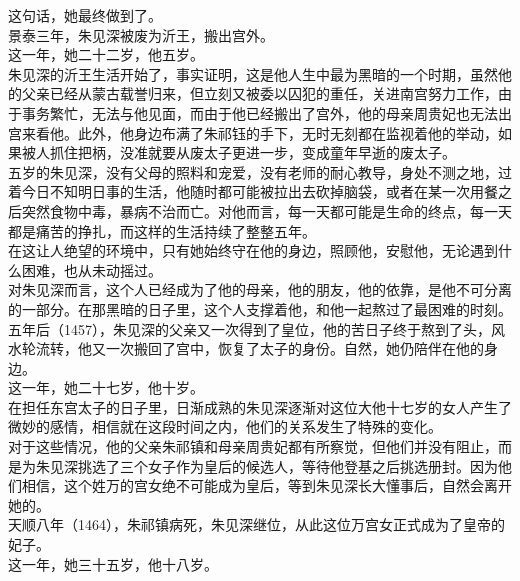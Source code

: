 \begin{multicols}{\theparacolNo}
这句话，她最终做到了。\\

景泰三年，朱见深被废为沂王，搬出宫外。\\

这一年，她二十二岁，他五岁。\\

朱见深的沂王生活开始了，事实证明，这是他人生中最为黑暗的一个时期，虽然他的父亲已经从蒙古载誉归来，但立刻又被委以囚犯的重任，关进南宫努力工作，由于事务繁忙，无法与他见面，而由于他已经搬出了宫外，他的母亲周贵妃也无法出宫来看他。此外，他身边布满了朱祁钰的手下，无时无刻都在监视着他的举动，如果被人抓住把柄，没准就要从废太子更进一步，变成童年早逝的废太子。\\

五岁的朱见深，没有父母的照料和宠爱，没有老师的耐心教导，身处不测之地，过着今日不知明日事的生活，他随时都可能被拉出去砍掉脑袋，或者在某一次用餐之后突然食物中毒，暴病不治而亡。对他而言，每一天都可能是生命的终点，每一天都是痛苦的挣扎，而这样的生活持续了整整五年。\\

在这让人绝望的环境中，只有她始终守在他的身边，照顾他，安慰他，无论遇到什么困难，也从未动摇过。\\

对朱见深而言，这个人已经成为了他的母亲，他的朋友，他的依靠，是他不可分离的一部分。在那黑暗的日子里，这个人支撑着他，和他一起熬过了最困难的时刻。\\

五年后（1457），朱见深的父亲又一次得到了皇位，他的苦日子终于熬到了头，风水轮流转，他又一次搬回了宫中，恢复了太子的身份。自然，她仍陪伴在他的身边。\\

这一年，她二十七岁，他十岁。\\

在担任东宫太子的日子里，日渐成熟的朱见深逐渐对这位大他十七岁的女人产生了微妙的感情，相信就在这段时间之内，他们的关系发生了特殊的变化。\\

对于这些情况，他的父亲朱祁镇和母亲周贵妃都有所察觉，但他们并没有阻止，而是为朱见深挑选了三个女子作为皇后的候选人，等待他登基之后挑选册封。因为他们相信，这个姓万的宫女绝不可能成为皇后，等到朱见深长大懂事后，自然会离开她的。\\

天顺八年（1464），朱祁镇病死，朱见深继位，从此这位万宫女正式成为了皇帝的妃子。\\

这一年，她三十五岁，他十八岁。\\


\end{multicols}
